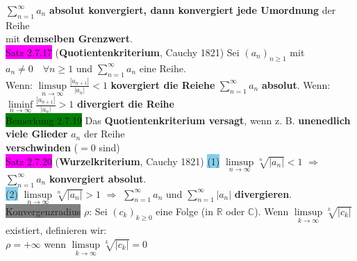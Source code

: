 \documentclass[10pt]{article}
\begin{document}
                \textcolor{NavyBlue}{$\sum_{n=1}^\infty a_n$} \textbf{absolut 
                konvergiert, dann konvergiert jede Umordnung} der Reihe \\
        \indent mit \textbf{demselben Grenzwert}.\\
\colorbox{magenta}{Satz 2.7.17} (\textbf{Quotientenkriterium}, Cauchy 1821) Sei 
                \textcolor{NavyBlue}{$(a_n)_{n\geqslant1}$} mit 
                \textcolor{NavyBlue}{$a_n\neq0\quad\forall n\geqslant1$}
                und \textcolor{NavyBlue}{$\sum_{n=1}^\infty a_n$} eine Reihe.\\
        \indent Wenn: 
                \textcolor{NavyBlue}{$\limsup\limits_{n\to\infty}\frac{|a_{n+1}|}{|a_n|}<1$}
                \textbf{kovergiert die Reiehe} 
                \textcolor{NavyBlue}{$\sum_{n=1}^\infty a_n$} \textbf{absolut}.
                Wenn: 
                \textcolor{NavyBlue}{$\liminf\limits_{n\to\infty}\frac{|a_{n+1}|}{|a_n|}>1$}
                \textbf{divergiert die Reihe}\\
\colorbox{green}{Bemerkung 2.7.19} Das \textbf{Quotientenkriterium versagt}, wenn z. B. 
                \textbf{unenedlich viele Glieder} $a_n$ der Reihe \\
        \indent \textbf{verschwinden} ($=0$ sind)\\
\colorbox{magenta}{Satz 2.7.20} (\textbf{Wurzelkriterium}, Cauchy 1821)
                \colorbox{SkyBlue}{(1)} 
                \textcolor{NavyBlue}{$\limsup\limits_{n\to\infty}\sqrt[n]{|a_n|}<1$}
                $\Longrightarrow$
                \textcolor{NavyBlue}{$\sum_{n=1}^\infty a_n$} \textbf{konvergiert absolut}.\\
        \indent \colorbox{SkyBlue}{(2)} 
                \textcolor{NavyBlue}{$\limsup\limits_{n\to\infty}\sqrt[n]{|a_n|}>1$}
                $\Longrightarrow$
                \textcolor{NavyBlue}{$\sum_{n=1}^\infty a_n$} und 
                \textcolor{NavyBlue}{$\sum_{n=1}^\infty |a_n|$}
                \textbf{divergieren}.\\
\colorbox{gray}{Konvergenzradius} \textcolor{NavyBlue}{$\rho$}: 
                Sei \textcolor{NavyBlue}{$(c_k)_{k\geqslant0}$} eine Folge 
                (in $\mathbb{R}$ oder $\mathbb{C}$). Wenn 
                \textcolor{NavyBlue}{$\limsup\limits_{k\to\infty}\sqrt[k]{|c_k|}$} 
                existiert, definieren wir: \\
        \indent \textcolor{NavyBlue}{$\rho=+\infty$}
                wenn \textcolor{NavyBlue}{$\limsup\limits_{k\to\infty}\sqrt[k]{|c_k|}=0$}
\end{document}
